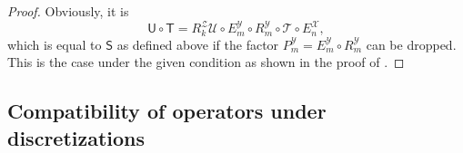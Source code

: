 \documentclass[a4paper]{paper}
\newcommand{\Spc}[1]{\mathscr{#1}}
\newcommand{\Op}[1]{\mathcal{#1}}
\newcommand{\DiscOp}[1]{\mathsf{#1}}
\newcommand*{\EXT}[2]{\ensuremath{E_{#1}^{#2}}}
\newcommand*{\REST}[2]{\ensuremath{R_{#1}^{#2}}}
\newcommand*{\PROJ}[2]{\ensuremath{P_{#1}^{#2}}}
\newcommand*{\RmY}{\ensuremath{\REST{m}{\Spc{Y}}}}
\newcommand*{\EnX}{\ensuremath{\EXT{n}{\Spc{X}}}}
\newcommand*{\EmY}{\ensuremath{\EXT{m}{\Spc{Y}}}}
\newcommand*{\PmY}{\ensuremath{\PROJ{m}{\Spc{Y}}}}
\begin{document}
\begin{proof}
 Obviously, it is
 \begin{equation*}
  \DiscOp{U} \circ \DiscOp{T} = \REST{k}{\Spc{Z}} \Op{U} \circ \EmY \circ \RmY \circ \Op{T} \circ \EnX,
 \end{equation*}
 which is equal to $\DiscOp{S}$ as defined above if the factor $\PmY = \EmY \circ \RmY$ can be dropped. This is the 
 case under the given condition as shown in the proof of .
\end{proof}


\subsection{Compatibility of operators under discretizations}
\end{document}
